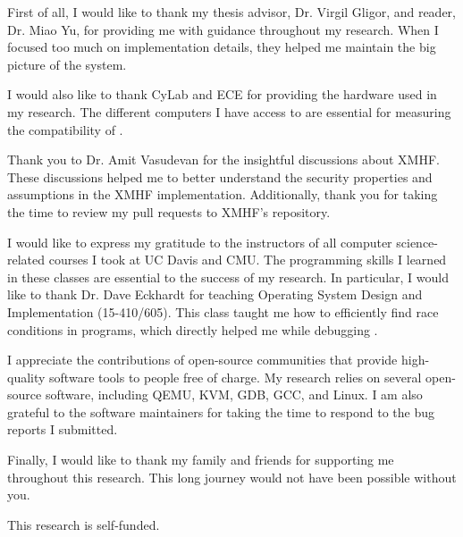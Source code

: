 \acknowledgements

First of all, I would like to thank my thesis advisor, Dr. Virgil Gligor, and reader, Dr. Miao Yu, for providing me with guidance throughout my research. When I focused too much on implementation details, they helped me maintain the big picture of the system.

I would also like to thank CyLab and ECE for providing the hardware used in my research. The different computers I have access to are essential for measuring the compatibility of .

Thank you to Dr. Amit Vasudevan for the insightful discussions about XMHF. These discussions helped me to better understand the security properties and assumptions in the XMHF implementation. Additionally, thank you for taking the time to review my pull requests to XMHF's repository.

I would like to express my gratitude to the instructors of all computer science-related courses I took at UC Davis and CMU. The programming skills I learned in these classes are essential to the success of my research. In particular, I would like to thank Dr. Dave Eckhardt for teaching Operating System Design and Implementation (15-410/605). This class taught me how to efficiently find race conditions in programs, which directly helped me while debugging .

I appreciate the contributions of open-source communities that provide high-quality software tools to people free of charge. My research relies on several open-source software, including QEMU, KVM, GDB, GCC, and Linux. I am also grateful to the software maintainers for taking the time to respond to the bug reports I submitted.

Finally, I would like to thank my family and friends for supporting me throughout this research. This long journey would not have been possible without you.

This research is self-funded.


